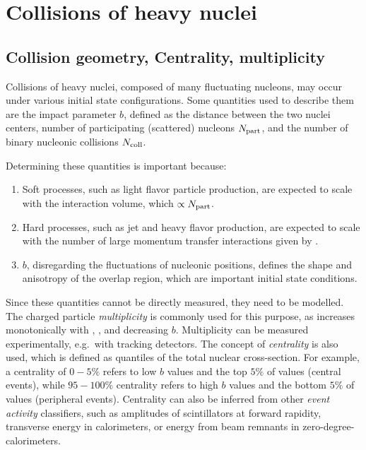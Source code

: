 \def \imgpath {"./figures/colls"}
\section{Collisions of heavy nuclei}

\subsection{Collision geometry, Centrality, multiplicity}

Collisions of heavy nuclei, composed of many fluctuating nucleons, may occur under various initial state configurations. Some quantities used to describe them are the impact parameter $b$, defined as the distance between the two nuclei centers, number of participating (scattered) nucleons $N_\mathrm{part}$, and the number of binary nucleonic collisions $N_\mathrm{coll}$.

Determining these quantities is important because:
\begin{enumerate}
\item Soft processes, such as light flavor particle production, are expected to scale with the interaction volume, which $\propto N_\mathrm{part}$.
\item Hard processes, such as jet and heavy flavor production, are expected to scale with the number of large momentum transfer interactions given by \Ncoll.
\item $b$, disregarding the fluctuations of nucleonic positions, defines the shape and anisotropy of the overlap region, which are important initial state conditions.
\end{enumerate}

Since these quantities cannot be directly measured, they need to be modelled. The charged particle \textit{multiplicity} is commonly used for this purpose, as \meanNch increases monotonically with \Npart, \Ncoll, and decreasing $b$. Multiplicity \Nch can be measured experimentally, e.g.\ with tracking detectors. The concept of \textit{centrality} is also used, which is defined as quantiles of the total nuclear cross-section. For example, a centrality of $0-5\%$ refers to low $b$ values and the top $5\%$ of \Nch values (central events), while $95-100\%$ centrality refers to high $b$ values and the bottom $5\%$ of \Nch values (peripheral events). Centrality can also be inferred from other \textit{event activity} classifiers, such as amplitudes of scintillators at forward rapidity, transverse energy in calorimeters, or energy from beam remnants in zero-degree-calorimeters.

